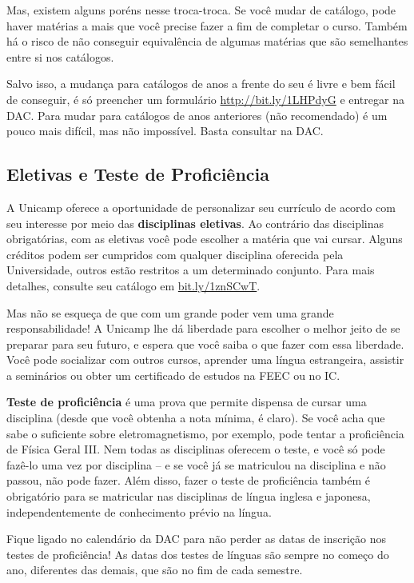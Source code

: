 Mas, existem alguns poréns nesse troca-troca. Se você mudar de catálogo, pode 
haver matérias a mais que você precise fazer a fim de completar o curso. Também 
há o risco de não conseguir equivalência de algumas matérias que são semelhantes 
entre si nos catálogos. 

Salvo isso, a mudança para catálogos de anos a frente do seu é livre e bem fácil 
de conseguir, é só preencher um formulário \url{http://bit.ly/1LHPdyG}
e entregar na DAC. Para mudar para catálogos de anos anteriores (não recomendado)
é um pouco mais difícil, mas não impossível. Basta consultar na DAC.

\subsection{Eletivas e Teste de Proficiência}

A Unicamp oferece a oportunidade de personalizar seu currículo de
acordo com seu interesse por meio das \textbf{disciplinas eletivas}. Ao
contrário das disciplinas obrigatórias, com as eletivas você pode escolher a
matéria que vai cursar. Alguns créditos podem ser cumpridos com qualquer
disciplina oferecida pela Universidade, outros estão restritos a um determinado
conjunto. Para mais detalhes, consulte seu catálogo em
\url{bit.ly/1znSCwT}.

Mas não se esqueça de que com um grande poder vem uma grande responsabilidade!
A Unicamp lhe dá liberdade para escolher o melhor jeito de se preparar para seu
futuro, e espera que você saiba o que fazer com essa liberdade. Você pode
socializar com outros cursos, aprender uma língua estrangeira, assistir a
seminários ou obter um certificado de estudos na FEEC ou no IC.

\textbf{Teste de proficiência} é uma prova que permite dispensa de cursar uma
disciplina (desde que você obtenha a nota mínima, é claro). Se você acha que
sabe o suficiente sobre eletromagnetismo, por exemplo, pode tentar a
proficiência de Física Geral III.  Nem todas as disciplinas oferecem o teste, e
você só pode fazê-lo uma vez por disciplina -- e se você já se matriculou na
disciplina e não passou, não pode fazer.  Além disso, fazer o teste de
proficiência também é obrigatório para se matricular nas disciplinas de língua
inglesa e japonesa, independentemente de conhecimento prévio na língua.

Fique ligado no calendário da DAC para não perder as datas de inscrição nos
testes de proficiência! As datas dos testes de línguas são sempre no começo do
ano, diferentes das demais, que são no fim de cada semestre.

